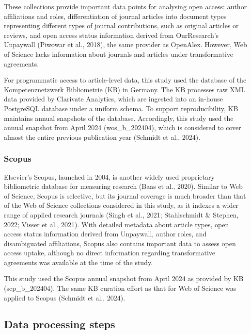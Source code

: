 \documentclass[a4paper,man,floatsintext,longtable,noextraspace,10pt]{apa6}
\begin{document}
These collections provide important data points for analysing open
access: author affiliations and roles, differentiation of journal
articles into document types representing different types of journal
contributions, such as original articles or reviews, and open access
status information derived from OurResearch's Unpaywall (Piwowar et al.,
2018), the same provider as OpenAlex. However, Web of Science lacks
information about journals and articles under transformative agreements.

For programmatic access to article-level data, this study used the
database of the Kompetenznetzwerk Bibliometrie (KB) in Germany. The KB
processes raw XML data provided by Clarivate Analytics, which are
ingested into an in-house PostgreSQL database under a uniform schema. To
support reproducibility, KB maintains annual snapshots of the database.
Accordingly, this study used the annual snapshot from April 2024
(wos\_b\_202404), which is considered to cover almost the entire
previous publication year (Schmidt et al., 2024).

\subsubsection{Scopus}\label{scopus}

Elsevier's Scopus, launched in 2004, is another widely used proprietary
bibliometric database for measuring research (Baas et al., 2020).
Similar to Web of Science, Scopus is selective, but its journal coverage
is much broader than that of the Web of Science collections considered
in this study, as it indexes a wider range of applied research journals
(Singh et al., 2021; Stahlschmidt \& Stephen, 2022; Visser et al.,
2021). With detailed metadata about article types, open access status
information derived from Unpaywall, author roles, and disambiguated
affiliations, Scopus also contains important data to assess open access
uptake, although no direct information regarding transformative
agreements was available at the time of the study.

This study used the Scopus annual snapshot from April 2024 as provided
by KB (scp\_b\_202404). The same KB curation effort as that for Web of
Science was applied to Scopus (Schmidt et al., 2024).

\subsection{Data processing steps}\label{data-processing-steps}
\end{document}
